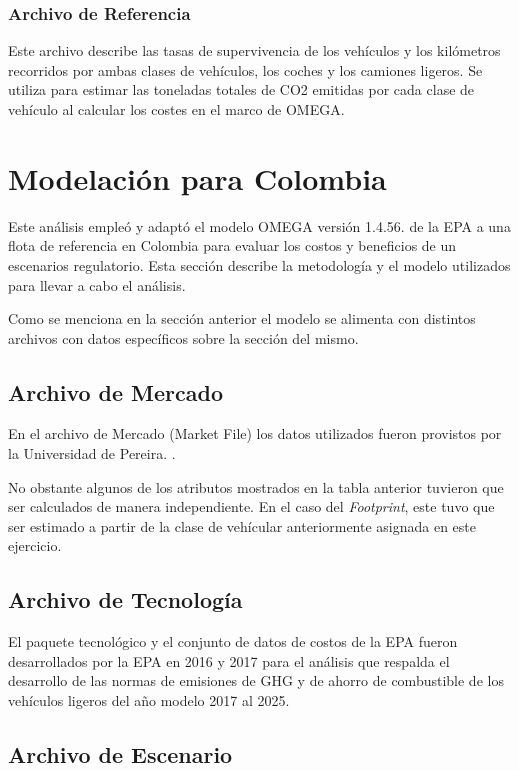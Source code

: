 \subsubsection{Archivo de Referencia}

Este archivo describe las tasas de supervivencia de los vehículos y los kilómetros recorridos por ambas clases de vehículos, los coches y los camiones ligeros. Se utiliza para estimar las toneladas totales de CO2 emitidas por cada clase de vehículo al calcular los costes en el marco de OMEGA.

\section{Modelación para Colombia}

Este análisis empleó y adaptó el modelo OMEGA versión 1.4.56. \cite{EPA_2016-B} de la EPA a una flota de referencia en Colombia para evaluar los costos y beneficios de un escenarios regulatorio. Esta sección describe la metodología y el modelo utilizados para llevar a cabo el análisis. 

Como se menciona en la sección anterior \label{sec:omega} el modelo se alimenta con distintos archivos con datos específicos sobre la sección del mismo.

\subsection{Archivo de Mercado}

En el archivo de Mercado (Market File) los datos utilizados fueron provistos por la Universidad de Pereira. \cite{Baseline_Pereira_2020}. 

No obstante algunos de los atributos mostrados en la tabla anterior tuvieron que ser calculados de manera independiente. En el caso del \textit{Footprint}, este tuvo que ser estimado a partir de la clase de vehícular anteriormente asignada en este ejercicio.

\subsection{Archivo de Tecnología}

El paquete tecnológico y el conjunto de datos de costos de la EPA fueron desarrollados por la EPA en 2016 y 2017 para el análisis que respalda el desarrollo de las normas de emisiones de GHG y de ahorro de combustible de los vehículos ligeros del año modelo 2017 al 2025.

\subsection{Archivo de Escenario}

